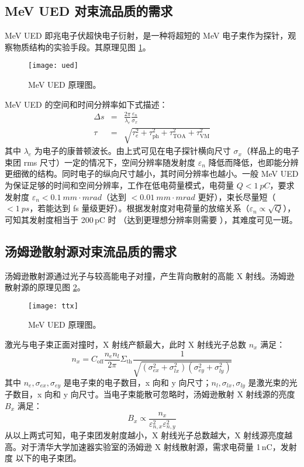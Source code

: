 \subsection{MeV UED 对束流品质的需求}
MeV UED 即兆电子伏超快电子衍射，是一种将超短的 MeV 电子束作为探针，观察物质结构的实验手段。其原理见图 \ref{fig:ued}。
\begin{figure}[htbp]
\centering
\texttt{[image: ued]}
\caption{\label{fig:ued} MeV UED 原理图\cite{Li:aa}。}
\end{figure}

MeV UED 的空间和时间分辨率如下式描述\cite{Weathersby:2015aa}：
\begin{eqnarray}
\Delta s &=& \frac{2\pi}{\lambda_e}\frac{\varepsilon_n}{\sigma_x}\\
\tau &=& \sqrt{\tau_e^2+\tau_{\text{ph}}^2+\tau_{\text{TOA}}^2+\tau_{\text{VM}}^2}
\end{eqnarray}
其中 $\lambda_e$ 为电子的康普顿波长。由上式可见在电子探针横向尺寸 $\sigma_x$（样品上的电子束团 rms 尺寸）一定的情况下，空间分辨率随发射度 $\varepsilon_{n}$ 降低而降低，也即能分辨更细微的结构。同时电子的纵向尺寸越小，其时间分辨率也越小。一般 MeV UED 为保证足够的时间和空间分辨率，工作在低电荷量模式，电荷量 $Q < \SI{1}{pC}$，要求发射度 $\varepsilon_{n} < \SI{0.1}{mm\cdot mrad}$（达到 $<\SI{0.01}{mm\cdot mrad}$ 更好），束长尽量短（$<\SI{1}{ps}$，若能达到 fs 量级更好）。根据发射度对电荷量的放缩关系（$\varepsilon_n\propto\sqrt{Q}$），可知其发射度相当于 200\,pC 时 （达到更理想分辨率则需要 ），其难度可见一斑。

\subsection{汤姆逊散射源对束流品质的需求}
汤姆逊散射源通过光子与较高能电子对撞，产生背向散射的高能 X 射线\cite{Milburn:1963aa,Fiocco:1963aa}。汤姆逊散射源的原理见图 \ref{fig:ttx}。
\begin{figure}[htbp]
\centering
\texttt{[image: ttx]}
\caption{\label{fig:ttx} MeV UED 原理图。}
\end{figure}

激光与电子束正面对撞时，X 射线产额最大，此时 X 射线光子总数 $n_x$ 满足\cite{huangwenhui:2004aa}：
\begin{equation}
n_x = C_{\text{off}}\frac{n_en_l}{2\pi}\Sigma_{\text{th}}\frac{1}{\sqrt{(\sigma_{ex}^2+\sigma_{lx}^2)(\sigma_{ey}^2+\sigma_{ly}^2)}}
\end{equation}
其中 $n_e, \sigma_{ex}, \sigma_{ey}$ 是电子束的电子数目，x 向和 y 向尺寸；$n_l, \sigma_{lx}, \sigma_{ly}$ 是激光束的光子数目，x 向和 y 向尺寸。当电子束能散可忽略时，汤姆逊散射 X 射线源的亮度 $B_x$ 满足\cite{duyingchao:2006aa}：
\begin{equation}
B_x \propto \frac{n_x}{\varepsilon_{n, x}^2\varepsilon_{n, y}^2}
\end{equation}
从以上两式可知，电子束团发射度越小，X 射线光子总数越大，X 射线源亮度越高。对于清华大学加速器实验室的汤姆逊 X 射线散射源，需求电荷量 1\,nC，发射度  以下的电子束团\cite{Qian:2012aa}。

